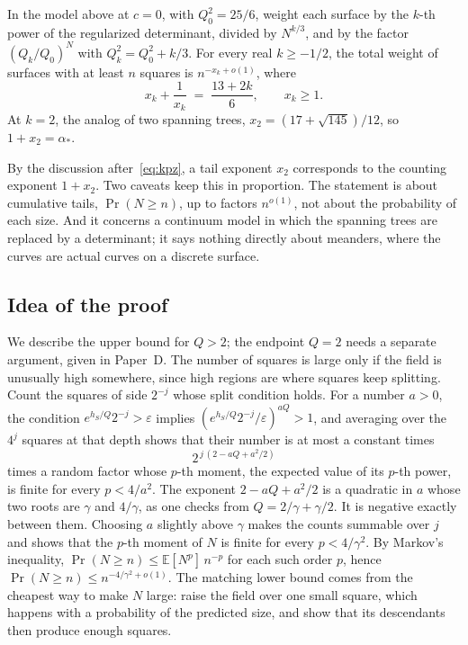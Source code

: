\begin{theorem}\label{thm:apps}
In the model above at $c=0$, with $Q_0^2=25/6$, weight each surface by the $k$-th power of the
regularized determinant, divided by $N^{k/3}$, and by the factor $(Q_k/Q_0)^N$ with
$Q_k^2=Q_0^2+k/3$. For every real $k\ge-1/2$, the total weight of surfaces with at least $n$
squares is $n^{-x_k+o(1)}$, where
\[ x_k+\frac1{x_k} \;=\; \frac{13+2k}{6},\qquad x_k\ge1 .\]
At $k=2$, the analog of two spanning trees, $x_2=(17+\sqrt{145})/12$, so
$1+x_2=\alpha_*$.
\end{theorem}

By the discussion after~\eqref{eq:kpz}, a tail exponent $x_2$ corresponds to the counting
exponent $1+x_2$. Two caveats keep this in proportion. The statement is about cumulative tails,
$\Pr(N\ge n)$, up to factors $n^{o(1)}$, not about the probability of each size. And it concerns
a continuum model in which the spanning trees are replaced by a determinant; it says nothing
directly about meanders, where the curves are actual curves on a discrete surface.

\subsection{Idea of the proof}\label{sec:tailidea}

We describe the upper bound for $Q>2$; the endpoint $Q=2$ needs a separate argument, given in
Paper~D. The number of squares is large only if the field is unusually high somewhere, since
high regions are where squares keep splitting. Count the squares of side $2^{-j}$ whose split
condition holds.
For a number $a>0$, the condition $e^{h_S/Q}2^{-j}>\varepsilon$ implies
$(e^{h_S/Q}2^{-j}/\varepsilon)^{aQ}>1$, and averaging over the $4^j$ squares at that depth shows
that their number is at most a constant times
\[ 2^{\,j\,(2-aQ+a^2/2)} \]
times a random factor whose $p$-th moment, the expected value of its $p$-th power, is finite for
every $p<4/a^2$. The exponent
$2-aQ+a^2/2$ is a quadratic in $a$ whose two roots are $\gamma$ and $4/\gamma$, as one checks from
$Q=2/\gamma+\gamma/2$. It is negative exactly between them. Choosing $a$ slightly above $\gamma$
makes the counts summable over $j$ and shows that the $p$-th moment of $N$ is finite for every
$p<4/\gamma^2$. By Markov's inequality, $\Pr(N\ge n)\le \mathbb E[N^p]\,n^{-p}$ for each such
order $p$, hence $\Pr(N\ge n)\le n^{-4/\gamma^2+o(1)}$. The matching lower bound comes from the
cheapest way to make $N$ large: raise the field over one small square, which happens with a
probability of the predicted size, and show that its descendants then produce enough squares.

